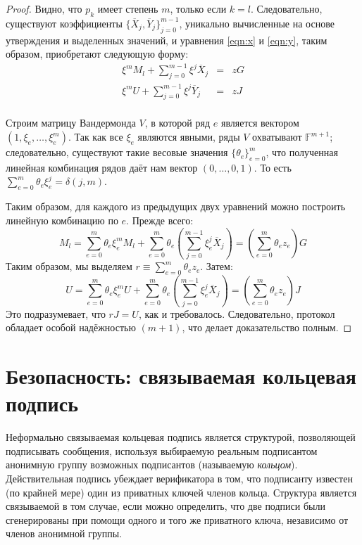 \documentclass{article}
\newcommand{\F}{\mathbb{F}}
\newcommand{\sumj}{\sum_{j=0}^{m-1}}
\theoremstyle{definition}
\begin{document}
\begin{proof}
Видно, что $p_k$ имеет степень $m$, только если $k = l$.
Следовательно, существуют коэффициенты $\{\overline{X}_j,\overline{Y}_j\}_{j=0}^{m-1}$, уникально вычисленные на основе утверждения и выделенных значений, и уравнения \ref{eqn:x} и \ref{eqn:y}, таким образом, приобретают следующую форму:
\begin{eqnarray*}
\xi^m M_l + \sumj \xi^j\overline{X}_j &=& zG \\
\xi^m U + \sumj \xi^j\overline{Y}_j &=& zJ \\
\end{eqnarray*}

Строим матрицу Вандермонда $V$, в которой ряд $e$ является вектором $(1,\xi_e,\ldots,\xi^m_e)$.
Так как все $\xi_e$ являются явными, ряды $V$ охватывают $\F^{m+1}$; следовательно, существуют такие весовые значения $\{\theta_e\}_{e=0}^m$, что полученная линейная комбинация рядов даёт нам вектор $(0,\ldots,0,1)$.
То есть $\sum_{e=0}^m \theta_e\xi_e^j = \delta(j,m)$.

Таким образом, для каждого из предыдущих двух уравнений можно построить линейную комбинацию по $e$.
Прежде всего:
$$M_l = \sum_{e=0}^m \theta_e\xi_e^m M_l + \sum_{e=0}^m \theta_e \left( \sumj \xi_e^j \overline{X}_j \right) = \left( \sum_{e=0}^m \theta_e z_e \right) G$$
Таким образом, мы выделяем $r \equiv \sum_{e=0}^m \theta_e z_e$.
Затем:
$$U = \sum_{e=0}^m \theta_e\xi_e^m U + \sum_{e=0}^m \theta_e \left( \sumj \xi_e^j \overline{X}_j \right) = \left( \sum_{e=0}^m \theta_e z_e \right) J$$
Это подразумевает, что $rJ = U$, как и требовалось.
Следовательно, протокол обладает особой надёжностью $(m+1)$, что делает доказательство полным.
\end{proof}


\section{Безопасность: связываемая кольцевая подпись}
Неформально связываемая кольцевая подпись является структурой, позволяющей подписывать сообщения, используя выбираемую реальным подписантом анонимную группу возможных подписантов (называемую \textit{кольцом}).
Действительная подпись убеждает верификатора в том, что подписанту известен (по крайней мере) один из приватных ключей членов кольца. Структура является связываемой в том случае, если можно определить, что две подписи были сгенерированы при помощи одного и того же приватного ключа, независимо от членов анонимной группы.
\end{document}
